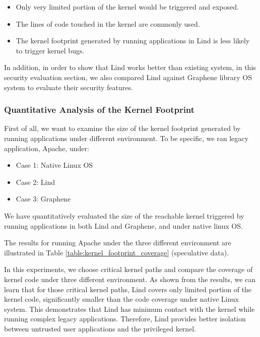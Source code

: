 \begin{itemize} 
  
  \item Only very limited portion of the kernel would be triggered and exposed. 
  
  \item The lines of code touched in the kernel are commonly used.
  
  \item The kernel footprint generated by running applications in Lind is less likely to trigger kernel bugs.
  
\end{itemize}

\par 
In addition, in order to show that Lind works better than existing system, in this security evaluation section, we also compared Lind against Graphene library OS system \cite{Graphene:14} to evaluate their security features. 

\subsubsection{Quantitative Analysis of the Kernel Footprint}

\par
First of all, we want to examine the size of the kernel footprint generated by running applications under different environment.
To be specific, we ran legacy application, Apache, under: 

\begin{itemize} 
  
  \item Case 1: Native Linux OS
  
  \item Case 2: Lind
  
  \item Case 3: Graphene
  
\end{itemize}


\par
We have quantitatively evaluated the size of the reachable kernel triggered by running applications in both Lind and Graphene, and under native linux OS.

\par
The results for running Apache under the three different environment are illustrated in Table \ref{table:kernel_footprint_coverage} (speculative data).

\par
In this experiments, we choose critical kernel paths and compare the coverage of kernel code under three different environment.
As shown from the results, we can learn that for those critical kernel paths, Lind covers only limited portion of the kernel code, significantly smaller than the code coverage under native Linux system. This demonstrates that Lind has minimum contact with the kernel while running complex legacy applications. Therefore, Lind provides better isolation between untrusted user applications and the privileged kernel. 



